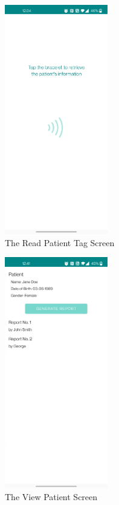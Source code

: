 \begin{figure}
\centering
\includegraphics[width=0.4\textwidth]{figures/read_tag_screen.png}
\caption{The Read Patient Tag Screen}
\label{fig:read-tag-screen}
\end{figure}

\begin{figure}
\centering
\includegraphics[width=0.4\textwidth]{figures/view_patient_screen.png}
\caption{The View Patient Screen}
\label{fig:view-patient-screen}
\end{figure}

